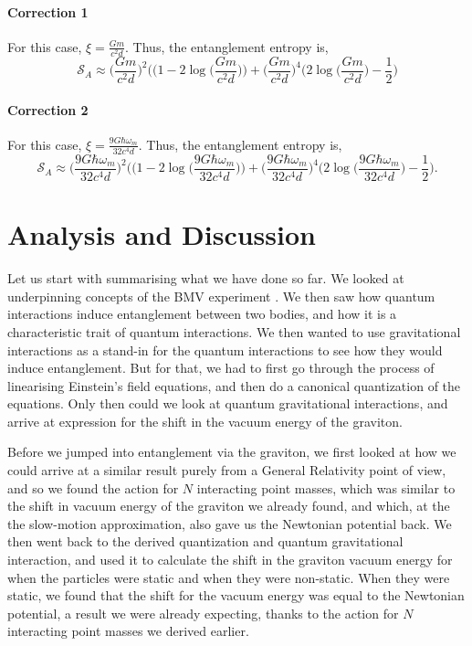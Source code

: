 \documentclass[12pt,a4paper]{report}
\theoremstyle{plain}
\theoremstyle{definition}
\theoremstyle{remark}
\begin{document}
\subsubsection{Correction 1}
For this case, $\xi = \frac{Gm}{c^2d}.$
Thus, the entanglement entropy is,
\begin{equation}
    \mathcal{S}_A \approx \Big(\frac{Gm}{c^2d}\Big)^2 \Big((1 - 2\log\Big(\frac{Gm}{c^2d}\Big)\Big) + \Big(\frac{Gm}{c^2d}\Big)^4 \Big(2\log\Big(\frac{Gm}{c^2d}\Big) - \frac{1}{2}\Big)
\end{equation}
\subsubsection{Correction 2}
For this case, $\xi = \frac{9G\hbar\omega_m}{32c^4d}.$
Thus, the entanglement entropy is,
\begin{equation}
    \mathcal{S}_A \approx \Big(\frac{9G\hbar\omega_m}{32c^4d}\Big)^2 \Big((1 - 2\log\Big(\frac{9G\hbar\omega_m}{32c^4d}\Big)\Big) + \Big(\frac{9G\hbar\omega_m}{32c^4d}\Big)^4 \Big(2\log\Big(\frac{9G\hbar\omega_m}{32c^4d}\Big) - \frac{1}{2}\Big).
\end{equation}
\newpage
\chapter{Analysis and Discussion} \label{chap: Analysis}
Let us start with summarising what we have done so far. We looked at underpinning concepts of the BMV experiment \cite{Bose_2017, Marletto_2017}. We then saw how quantum interactions induce entanglement between two bodies, and how it is a characteristic trait of quantum interactions. We then wanted to use gravitational interactions as a stand-in for the quantum interactions to see how they would induce entanglement. But for that, we had to first go through the process of linearising Einstein's field equations, and then do a canonical quantization of the equations. Only then could we look at quantum gravitational interactions, and arrive at expression for the shift in the vacuum energy of the graviton.

Before we jumped into entanglement via the graviton, we first looked at how we could arrive at a similar result purely from a General Relativity point of view, and so we found the action for $N$ interacting point masses, which was similar to the shift in vacuum energy of the graviton we already found, and which, at the the slow-motion approximation, also gave us the Newtonian potential back. We then went back to the derived quantization and quantum gravitational interaction, and used it to calculate the shift in the graviton vacuum energy for when the particles were static and when they were non-static. When they were static, we found that the shift for the vacuum energy was equal to the Newtonian potential, a result we were already expecting, thanks to the action for $N$ interacting point masses we derived earlier. 
\end{document}

